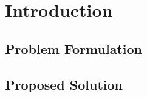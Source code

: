 \section{Introduction} \label{sec:introduction}

	\subsection{Problem Formulation} \label{ssec:problem}
	
	\subsection{Proposed Solution} \label{ssec:solution}
		

